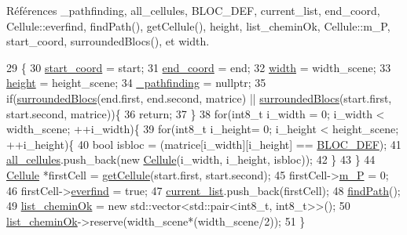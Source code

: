 Références \-\_\-pathfinding, all\-\_\-cellules, B\-L\-O\-C\-\_\-\-D\-E\-F, current\-\_\-list, end\-\_\-coord, Cellule\-::everfind, find\-Path(), get\-Cellule(), height, list\-\_\-chemin\-Ok, Cellule\-::m\-\_\-\-P, start\-\_\-coord, surrounded\-Blocs(), et width.


\begin{DoxyCode}
29                                                                                       \{
30             \hyperlink{classPathFinding_a33dac4c9b17f5e6032bc0fc60e7a8249}{start\_coord} = start;
31             \hyperlink{classPathFinding_a7db7c62b00778fb60be8fdb10c471851}{end\_coord} = end;
32             \hyperlink{classPathFinding_a50f9513402ad1113678635c3eb9da62d}{width} = width\_scene;
33             \hyperlink{classPathFinding_a61e5643d7459d24b07306a6886348ca1}{height} = height\_scene;
34             \hyperlink{classPathFinding_ada148538e4a78dcc97f24ae74156abd4}{\_pathfinding} = \textcolor{keyword}{nullptr};
35             \textcolor{keywordflow}{if}(\hyperlink{classPathFinding_ad85b700719e73736e36d2548f950323a}{surroundedBlocs}(end.first, end.second, matrice) || 
      \hyperlink{classPathFinding_ad85b700719e73736e36d2548f950323a}{surroundedBlocs}(start.first, start.second, matrice))\{
36                 \textcolor{keywordflow}{return};
37             \}
38             \textcolor{keywordflow}{for}(int8\_t i\_width = 0; i\_width < width\_scene; ++i\_width)\{
39                 \textcolor{keywordflow}{for}(int8\_t i\_height= 0; i\_height < height\_scene; ++i\_height)\{
40                     \textcolor{keywordtype}{bool} isbloc = (matrice[i\_width][i\_height] == \hyperlink{definition_8h_a4d275339ef3ddec11c63b8b925b5b358}{BLOC\_DEF});
41                     \hyperlink{classPathFinding_ae2eff9f0d9ffba2d88d405d10c34660a}{all\_cellules}.push\_back(\textcolor{keyword}{new} \hyperlink{classCellule}{Cellule}(i\_width, i\_height, isbloc));
42                 \}
43             \}
44             \hyperlink{classCellule}{Cellule} *firstCell = \hyperlink{classPathFinding_a3817cc8f9d1604bf34a5a3b4f878b3da}{getCellule}(start.first, start.second);
45             firstCell->\hyperlink{classCellule_af7cb9856701ea3e423f58b09bb7dfdbd}{m\_P} = 0;
46             firstCell->\hyperlink{classCellule_a9c368e6fb89c5ea1e31b810207eca9ee}{everfind} = \textcolor{keyword}{true};
47             \hyperlink{classPathFinding_aac0f1388f79b45388470d634c909174e}{current\_list}.push\_back(firstCell);
48             \hyperlink{classPathFinding_addc7b9eb5682e0de46fd59c4a1319a86}{findPath}();
49             \hyperlink{classPathFinding_a1c1b4bc29b0f8a74f80d2601c83844aa}{list\_cheminOk} = \textcolor{keyword}{new} std::vector<std::pair<int8\_t, int8\_t>>();
50             \hyperlink{classPathFinding_a1c1b4bc29b0f8a74f80d2601c83844aa}{list\_cheminOk}->reserve(width\_scene*(width\_scene/2));
51         \}
\end{DoxyCode}
